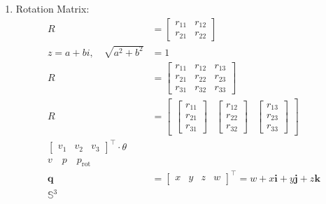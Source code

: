 \documentclass{article}
\begin{document}
\begin{enumerate}
    \item Rotation Matrix:
    \begin{align*}
        R &= \begin{bmatrix}
            r_{11} & r_{12} \\ r_{21} & r_{22}
        \end{bmatrix} \\
        z = a + bi, \quad \sqrt{a^2 + b^2} &= 1 \\
        R &= \begin{bmatrix}
            r_{11} & r_{12} & r_{13} \\ r_{21} & r_{22} & r_{23} \\ r_{31} & r_{32} & r_{33} 
        \end{bmatrix} \\
        R &= \begin{bmatrix}
            \begin{bmatrix}
                r_{11} \\ r_{21} \\ r_{31}
            \end{bmatrix} & \begin{bmatrix}
                r_{12} \\ r_{22} \\ r_{32}
            \end{bmatrix} & \begin{bmatrix}
                r_{13} \\ r_{23} \\ r_{33}
            \end{bmatrix}
        \end{bmatrix} \\
        \begin{bmatrix}
            v_1 & v_2 & v_3
        \end{bmatrix}^\top \cdot \theta \\
        v \quad p \quad p_{\text{rot}} \\
        \mathbf{q} &= \begin{bmatrix}
            x & y & z & w
        \end{bmatrix}^\top = w + x\mathbf{i} + y\mathbf{j} + z\mathbf{k} \\
        \mathbb{S}^3
    \end{align*}


\end{enumerate}
\end{document}
